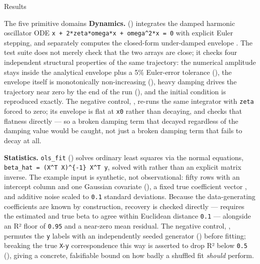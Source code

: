 \documentclass[
  ignorenonframetext,
]{beamer}
\begin{document}
\begin{frame}{Results}
\begin{block}{The five primitive domains}
\textbf{Dynamics.} 
() integrates the damped harmonic
oscillator ODE
\texttt{x\textquotesingle{}\textquotesingle{}\ +\ 2*zeta*omega*x\textquotesingle{}\ +\ omega\^{}2*x\ =\ 0}
with explicit Euler stepping, and separately computes the closed-form
under-damped envelope . The test suite
does not merely check that the two arrays are close; it checks four
independent structural properties of the same trajectory: the numerical
amplitude stays inside the analytical envelope plus a 5\% Euler-error
tolerance
(),
the envelope itself is monotonically non-increasing
(),
heavy damping drives the trajectory near zero by the end of the run
(), and the
initial condition is reproduced exactly. The negative control,
, re-runs the same integrator with
\texttt{zeta} forced to zero; its envelope is flat at \texttt{x0} rather
than decaying, and  checks
that flatness directly --- so a broken damping term that decayed
regardless of the damping value would be caught, not just a broken
damping term that fails to decay at all.

\textbf{Statistics.} \texttt{ols\_fit}
() solves ordinary least squares
via the normal equations,
\texttt{beta\_hat\ =\ (X\^{}T\ X)\^{}\{-1\}\ X\^{}T\ y}, solved with
 rather than an explicit matrix inverse. The
example input is synthetic, not observational: fifty rows with an
intercept column and one Gaussian covariate
(), a fixed true coefficient
vector , and additive noise scaled to
\texttt{0.1} standard deviations. Because the data-generating
coefficients are known by construction, recovery is checked directly ---
 requires the estimated and true
beta to agree within Euclidean distance \texttt{0.1} --- alongside an R²
floor of \texttt{0.95} and a near-zero mean residual. The negative
control, , permutes the \texttt{y} labels
with an independently seeded generator
() before fitting; breaking
the true \texttt{X}-\texttt{y} correspondence this way is asserted to
drop R² below \texttt{0.5}
(), giving a concrete,
falsifiable bound on how badly a shuffled fit \emph{should} perform.


\end{block}
\end{frame}
\end{document}
